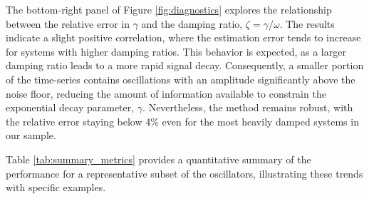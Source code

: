 \documentclass[]{article}
\begin{document}
The bottom-right panel of Figure \ref{fig:diagnostics} explores the relationship between the relative error in $\gamma$ and the damping ratio, $\zeta = \gamma / \omega$. The results indicate a slight positive correlation, where the estimation error tends to increase for systems with higher damping ratios. This behavior is expected, as a larger damping ratio leads to a more rapid signal decay. Consequently, a smaller portion of the time-series contains oscillations with an amplitude significantly above the noise floor, reducing the amount of information available to constrain the exponential decay parameter, $\gamma$. Nevertheless, the method remains robust, with the relative error staying below 4\% even for the most heavily damped systems in our sample.

Table \ref{tab:summary_metrics} provides a quantitative summary of the performance for a representative subset of the oscillators, illustrating these trends with specific examples.

\begin{table}[t]
    \centering
    \caption{Performance metrics for a representative subset of the oscillators. The table highlights the consistency of the MLE framework, showing the calculated Signal-to-Noise Ratio (SNR) and the relative errors for the recovered damping rate ($\gamma$) and angular frequency ($\omega$).}
    \label{tab:summary_metrics}
\end{table}
\end{document}
